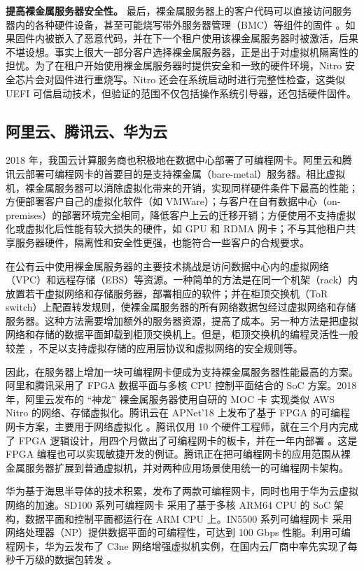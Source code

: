 \textbf{提高裸金属服务器安全性。}
最后，裸金属服务器上的客户代码可以直接访问服务器内的各种硬件设备，甚至可能烧写带外服务器管理（BMC）等组件的固件 \cite{bare-metal-security}。如果固件内被嵌入了恶意代码，并在下一个租户使用该裸金属服务器时被激活，后果不堪设想。事实上很大一部分客户选择裸金属服务器，正是出于对虚拟机隔离性的担忧。为了在租户开始使用裸金属服务器时提供安全和一致的硬件环境，Nitro 安全芯片会对固件进行重烧写。Nitro 还会在系统启动时进行完整性检查，这类似 UEFI 可信启动技术，但验证的范围不仅包括操作系统引导器，还包括硬件固件。

\subsection{阿里云、腾讯云、华为云}

2018 年，我国云计算服务商也积极地在数据中心部署了可编程网卡。阿里云和腾讯云部署可编程网卡的首要目的是支持裸金属（bare-metal）服务器。相比虚拟机，裸金属服务器可以消除虚拟化带来的开销，实现同样硬件条件下最高的性能；方便部署客户自己的虚拟化软件（如 VMWare）；与客户在自有数据中心（on-premises）的部署环境完全相同，降低客户上云的迁移开销；方便使用不支持虚拟化或虚拟化后性能有较大损失的硬件，如 GPU 和 RDMA 网卡；不与其他租户共享服务器硬件，隔离性和安全性更强，也能符合一些客户的合规要求。

在公有云中使用裸金属服务器的主要技术挑战是访问数据中心内的虚拟网络（VPC）和远程存储（EBS）等资源。一种简单的方法是在同一个机架（rack）内放置若干虚拟网络和存储服务器，部署相应的软件；并在柜顶交换机（ToR switch）上配置转发规则，使裸金属服务器的所有网络数据包经过虚拟网络和存储服务器。这种方法需要增加额外的服务器资源，提高了成本。另一种方法是把虚拟网络和存储的数据平面卸载到柜顶交换机上。但是，柜顶交换机的编程灵活性一般较差 \cite{tencent-smartnic}，不足以支持虚拟存储的应用层协议和虚拟网络的安全规则等。

因此，在服务器上增加一块可编程网卡便成为支持裸金属服务器性能最高的方案。阿里和腾讯采用了 FPGA 数据平面与多核 CPU 控制平面结合的 SoC 方案。2018 年，阿里云发布的 ``神龙'' 裸金属服务器使用自研的 MOC 卡 \cite{alicloud-smartnic,alicloud-xdragon} 实现类似 AWS Nitro 的网络、存储虚拟化。腾讯云在 APNet’18 上发布了基于 FPGA 的可编程网卡方案，主要用于网络虚拟化 \cite{tencent-smartnic}。腾讯仅用 10 个硬件工程师，就在三个月内完成了 FPGA 逻辑设计，用四个月做出了可编程网卡的板卡，并在一年内部署 \cite{tencent-smartnic}。这是 FPGA 编程也可以实现敏捷开发的例证。腾讯正在把可编程网卡的应用范围从裸金属服务器扩展到普通虚拟机，并对两种应用场景使用统一的可编程网卡架构。

华为基于海思半导体的技术积累，发布了两款可编程网卡，同时也用于华为云虚拟网络的加速。SD100 系列可编程网卡 \cite{sd100} 采用了基于多核 ARM64 CPU 的 SoC 架构，数据平面和控制平面都运行在 ARM CPU 上。IN5500 系列可编程网卡 \cite{in200} 采用网络处理器（NP）提供数据平面的可编程性，可达到 100 Gbps 性能。利用可编程网卡，华为云发布了 C3ne 网络增强虚拟机实例，在国内云厂商中率先实现了每秒千万级的数据包转发 \cite{huawei-smartnic}。
